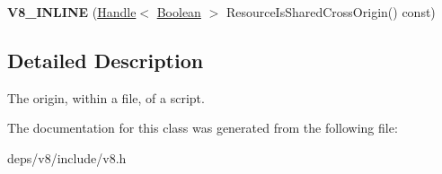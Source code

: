 \begin{DoxyCompactItemize}
\item 
\hypertarget{classv8_1_1_script_origin_a84a2ba3aae4e4c7ac5ad70a3a207d0b4}{}{\bfseries V8\+\_\+\+I\+N\+L\+I\+N\+E} (\hyperlink{classv8_1_1_handle}{Handle}$<$ \hyperlink{classv8_1_1_boolean}{Boolean} $>$ Resource\+Is\+Shared\+Cross\+Origin() const)\label{classv8_1_1_script_origin_a84a2ba3aae4e4c7ac5ad70a3a207d0b4}

\end{DoxyCompactItemize}


\subsection{Detailed Description}
The origin, within a file, of a script. 

The documentation for this class was generated from the following file\+:\begin{DoxyCompactItemize}
\item 
deps/v8/include/v8.\+h\end{DoxyCompactItemize}
